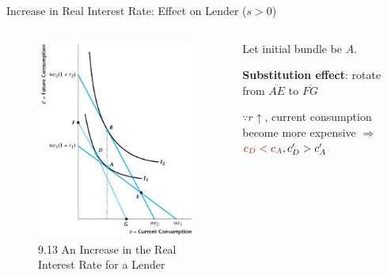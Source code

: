 \documentclass[11pt,aspectratio=169,usenames,dvipsnames]{beamer}
\newcommand{\red}[1]{\textcolor{red}{#1}}
\let\tempone\itemize
\let\temptwo\enditemize
\renewenvironment{itemize}{\tempone\addtolength{\itemsep}{\fill}}{\temptwo}
\begin{document}
\begin{frame}{Increase in Real Interest Rate: Effect on Lender ($s > 0$)}
\label{slide:Increase_in_Real_Interest_Rate__Effect_on_Lender}
    \begin{columns}
        \begin{column}{0.5\textwidth}
            \begin{figure}
                \caption{\scriptsize 9.13  An Increase in the Real Interest Rate for a Lender}
                \includegraphics[width=.9\textwidth]{./figures/Figure9_13.jpg}
            \end{figure}
        \end{column}
        \begin{column}{0.5\textwidth}
            Let initial bundle be $ A $.
            \begin{itemize}
                \item \textbf{Substitution effect}: rotate from $ \overline{AE} $ to $ \overline{FG} $
                \begin{itemize}
                    \item $ \because r \uparrow  $, \alert{current consumption become more expensive} $ \Rightarrow  $ $ \red{c_{D} < c_{A}}, c'_{D} > c'_{A} $

\end{itemize}
\end{itemize}
\end{column}
\end{columns}
\end{frame}
\end{document}
